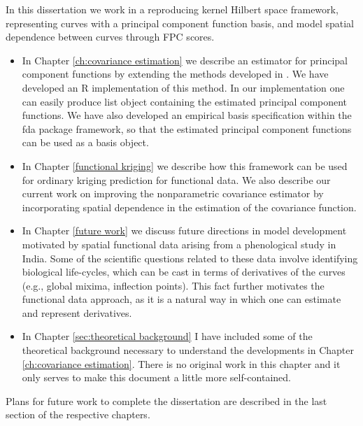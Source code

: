 In this dissertation we work in a reproducing kernel Hilbert space framework, representing curves with a principal component function basis, and model spatial dependence between curves through FPC scores.  
\begin{itemize}
\item In Chapter \ref{ch:covariance estimation} we describe an estimator for principal component functions by extending the methods developed in \cite{Cai:2010vr}. We have developed an R implementation of this method. In our implementation one can easily produce list object containing the estimated principal component functions. We have also developed an empirical basis specification  within the fda package framework, so that the estimated principal component functions can be used as a basis object.  %
\item In Chapter \ref{functional kriging} we describe how this framework can be used for ordinary kriging prediction for functional data. We also describe our current work on improving the nonparametric covariance estimator by incorporating spatial dependence in the estimation of the covariance function. 
\item  In Chapter \ref{future work} we discuss future directions in model development motivated by spatial functional data arising from a phenological study in India. Some of the scientific questions related to these data involve identifying biological life-cycles, which can be cast in terms of derivatives of the curves (e.g., global mixima, inflection points). This fact further motivates the functional data approach, as it is a natural way in which one can estimate and represent derivatives. 
\item In Chapter \ref{sec:theoretical background} I have included some of the theoretical background necessary to understand the developments in Chapter \ref{ch:covariance estimation}. There is no original work in this chapter and it only serves to make this document a little more self-contained. 
\end{itemize}

Plans for future work to complete the dissertation are described in the last section of the respective chapters. 

